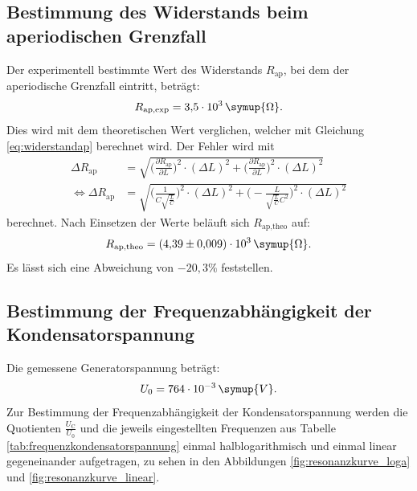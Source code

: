 
\subsection{Bestimmung des Widerstands beim aperiodischen Grenzfall}

Der experimentell bestimmte Wert des Widerstands $R_{\text{ap}}$, bei dem der aperiodische Grenzfall eintritt, beträgt:
\begin{equation*}
R_{\text{ap,exp}} = 3{,}5 \cdot 10^{3}\, \symup{\Omega}.
\end{equation*}
Dies wird mit dem theoretischen Wert verglichen, welcher mit Gleichung \eqref{eq:widerstandap} berechnet wird. Der Fehler wird mit
\begin{equation*}
\begin{aligned}
\Delta R_{\text{ap}} &= \sqrt{\biggl(\frac{\partial R_{\text{ap}}}{\partial L}\biggr)^2 \cdot (\Delta L)^2 + \biggl(\frac{\partial R_{\text{ap}}}{\partial L}\biggr)^2 \cdot (\Delta L)^2} \\
\iff \Delta R_{\text{ap}} &= \sqrt{\biggl(\frac{1}{C\sqrt{\frac{L}{C}}}\biggr)^2 \cdot (\Delta L)^2 + \biggl(-\frac{L}{\sqrt{\frac{L}{C}}C^2}\biggr)^2 \cdot (\Delta L)^2}
\end{aligned}
\end{equation*}
berechnet. Nach Einsetzen der Werte beläuft sich $R_{\text{ap,theo}}$ auf:
\begin{equation*}
R_{\text{ap,theo}} = (4{,}39 \pm 0{,}009)\cdot 10^{3}\, \symup{\Omega}.
\end{equation*}
Es lässt sich eine Abweichung von $-20{,}3\%$ feststellen.


\subsection{Bestimmung der Frequenzabhängigkeit der Kondensatorspannung}

Die gemessene Generatorspannung beträgt:
\begin{equation*}
U_0 = 764\cdot 10^{-3}\, \symup{V}.
\end{equation*}
Zur Bestimmung der Frequenzabhängigkeit der Kondensatorspannung werden die Quotienten $\frac{U_{\text{C}}}{U_0}$ und die jeweils eingestellten Frequenzen aus Tabelle \eqref{tab:frequenzkondensatorspannung} einmal 
halblogarithmisch und einmal linear gegeneinander aufgetragen, zu sehen in den Abbildungen \eqref{fig:resonanzkurve_loga} und \eqref{fig:resonanzkurve_linear}.

